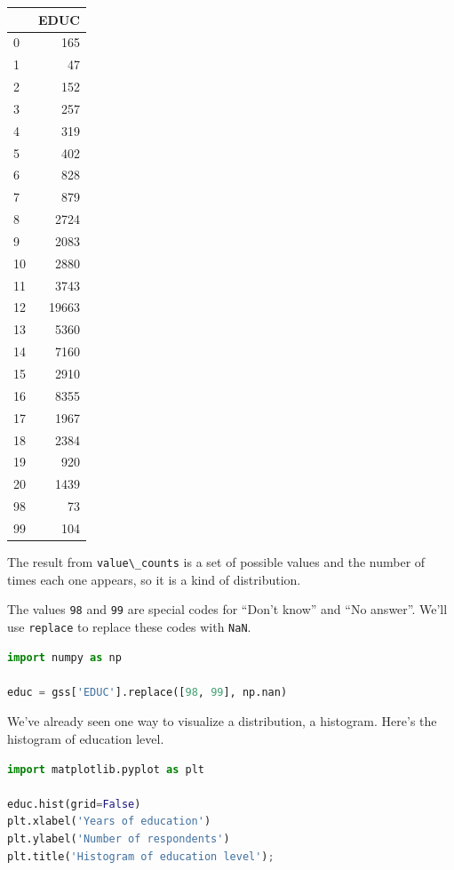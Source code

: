 \begin{tabular}{lr}
\toprule
{} &   EDUC \\
\midrule
0  &    165 \\
1  &     47 \\
2  &    152 \\
3  &    257 \\
4  &    319 \\
5  &    402 \\
6  &    828 \\
7  &    879 \\
8  &   2724 \\
9  &   2083 \\
10 &   2880 \\
11 &   3743 \\
12 &  19663 \\
13 &   5360 \\
14 &   7160 \\
15 &   2910 \\
16 &   8355 \\
17 &   1967 \\
18 &   2384 \\
19 &    920 \\
20 &   1439 \\
98 &     73 \\
99 &    104 \\
\bottomrule
\end{tabular}

The result from \passthrough{\lstinline!value\_counts!} is a set of
possible values and the number of times each one appears, so it is a
kind of distribution.

The values \passthrough{\lstinline!98!} and \passthrough{\lstinline!99!}
are special codes for ``Don't know'' and ``No answer''. We'll use
\passthrough{\lstinline!replace!} to replace these codes with
\passthrough{\lstinline!NaN!}.

\begin{lstlisting}[language=Python]
import numpy as np

educ = gss['EDUC'].replace([98, 99], np.nan)
\end{lstlisting}

We've already seen one way to visualize a distribution, a histogram.
Here's the histogram of education level.

\begin{lstlisting}[language=Python]
import matplotlib.pyplot as plt

educ.hist(grid=False)
plt.xlabel('Years of education')
plt.ylabel('Number of respondents')
plt.title('Histogram of education level');
\end{lstlisting}

